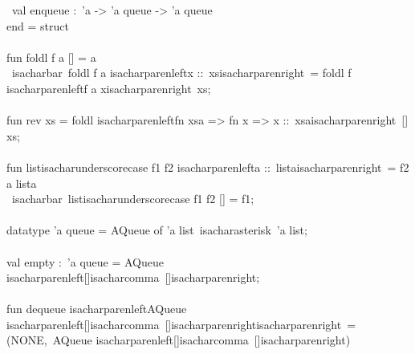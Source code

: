 \begin{isabellebody}
\begin{isamarkuptext}
\hspace*{0pt} ~val enqueue :~'a -> 'a queue -> 'a queue\\
\hspace*{0pt}end = struct\\
\hspace*{0pt}\\
\hspace*{0pt}fun foldl f a [] = a\\
\hspace*{0pt} ~{}{}isacharbar{}~foldl f a {}{}isacharparenleft{}x ::~xs{}{}isacharparenright{}~= foldl f {}{}isacharparenleft{}f a x{}{}isacharparenright{}~xs;\\
\hspace*{0pt}\\
\hspace*{0pt}fun rev xs = foldl {}{}isacharparenleft{}fn xsa => fn x => x ::~xsa{}{}isacharparenright{}~[] xs;\\
\hspace*{0pt}\\
\hspace*{0pt}fun list{}{}isacharunderscore{}case f1 f2 {}{}isacharparenleft{}a ::~lista{}{}isacharparenright{}~= f2 a lista\\
\hspace*{0pt} ~{}{}isacharbar{}~list{}{}isacharunderscore{}case f1 f2 [] = f1;\\
\hspace*{0pt}\\
\hspace*{0pt}datatype 'a queue = AQueue of 'a list{}~{}{}isacharasterisk{}~'a list;\\
\hspace*{0pt}\\
\hspace*{0pt}val empty :~'a queue = AQueue {}{}isacharparenleft{}[]{}{}isacharcomma{}~[]{}{}isacharparenright{};\\
\hspace*{0pt}\\
\hspace*{0pt}fun dequeue {}{}isacharparenleft{}AQueue {}{}isacharparenleft{}[]{}{}isacharcomma{}~[]{}{}isacharparenright{}{}{}isacharparenright{}~= (NONE,~AQueue {}{}isacharparenleft{}[]{}{}isacharcomma{}~[]{}{}isacharparenright{})\\

\end{isamarkuptext}
\end{isabellebody}
